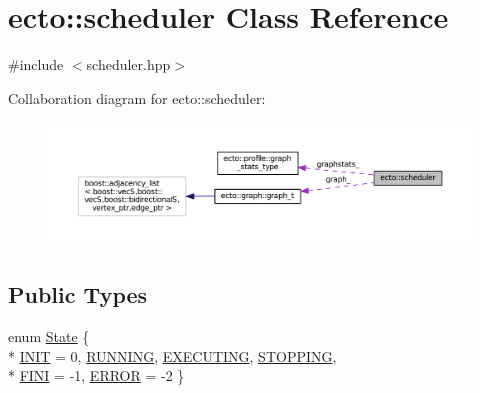 \hypertarget{classecto_1_1scheduler}{\section{ecto\-:\-:scheduler Class Reference}
\label{classecto_1_1scheduler}
}


{\ttfamily \#include $<$scheduler.\-hpp$>$}



Collaboration diagram for ecto\-:\-:scheduler\-:\nopagebreak
\begin{figure}[H]
\begin{center}
\leavevmode
\includegraphics[width=350pt]{classecto_1_1scheduler__coll__graph}
\end{center}
\end{figure}
\subsection*{Public Types}
\begin{DoxyCompactItemize}
\item 
enum \hyperlink{classecto_1_1scheduler_a6b063d1c4bb9dad58d7ace61946b1200}{State} \{ \\*
\hyperlink{classecto_1_1scheduler_a6b063d1c4bb9dad58d7ace61946b1200a347092c6b9c4bbc7084bfa04d9ffb57f}{I\-N\-I\-T} = 0, 
\hyperlink{classecto_1_1scheduler_a6b063d1c4bb9dad58d7ace61946b1200aef190614c39d85b915b9ff2225eacf02}{R\-U\-N\-N\-I\-N\-G}, 
\hyperlink{classecto_1_1scheduler_a6b063d1c4bb9dad58d7ace61946b1200a3e140c949a41686e2e0481d13e89c010}{E\-X\-E\-C\-U\-T\-I\-N\-G}, 
\hyperlink{classecto_1_1scheduler_a6b063d1c4bb9dad58d7ace61946b1200a0cf2ac365020f8cd0a6860a3983a0dad}{S\-T\-O\-P\-P\-I\-N\-G}, 
\\*
\hyperlink{classecto_1_1scheduler_a6b063d1c4bb9dad58d7ace61946b1200aa9b97654759582b6e92fbc17a31623bd}{F\-I\-N\-I} = -\/1, 
\hyperlink{classecto_1_1scheduler_a6b063d1c4bb9dad58d7ace61946b1200a45aebc05bdc20659645ad6e1729db520}{E\-R\-R\-O\-R} = -\/2
 \}
\end{DoxyCompactItemize}
